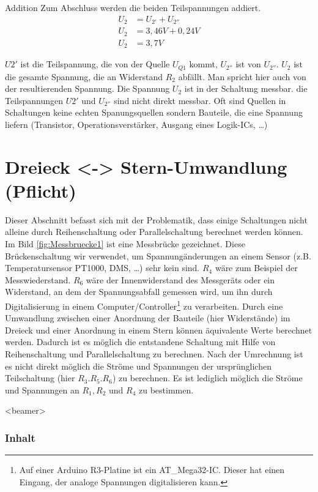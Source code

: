 \documentclass[a4paper, 10pt]{scrartcl}
\begin{document}
\begin{frame}{Addition}
  Zum Abschluss werden die beiden Teilspannungen addiert.
  \begin{align}
    U_2 &= U_{2'} + U_{2''}\\
    U_2 &= 3,46V + 0,24V\\
    U_2 &= 3,7V
  \end{align}
\end{frame}
$U{2'}$ ist die Teilspannung, die von der Quelle $U_{Q1}$ kommt, $U_{2''}$ ist von $U_{2''}$. $U_2$ ist die gesamte  Spannung, die an Widerstand $R_2$ abfällt. Man spricht hier auch von der resultierenden Spannung. Die Spannung $U_2$ ist in der Schaltung messbar. die Teilspannungen $U{2'}$ und $U_{2''}$ sind nicht direkt messbar. Oft sind Quellen in Schaltungen keine echten Spanungsquellen sondern Bauteile, die eine Spannung liefern (Transistor, Operationsverstärker, Ausgang eines Logik-ICs, \dots)

\section[Dreieck <-> Stern]{Dreieck <-> Stern-Umwandlung (Pflicht)}
Dieser Abschnitt befasst sich mit der Problematik, dass einige Schaltungen nicht alleine durch Reihenschaltung oder Parallelschaltung berechnet werden können. Im Bild \ref{fig:Messbruecke1} ist eine Messbrücke gezeichnet. Diese Brückenschaltung wir verwendet, um Spannungänderungen an einem Sensor (z.B. Temperatursensor PT1000, DMS, \dots ) sehr kein sind. $R_4$ wäre zum Beispiel der Messwiederstand. $R_6$ wäre der Innenwiderstand des Messgeräts oder ein Widerstand, an dem der Spannungsabfall gemessen wird, um ihn durch Digitalisierung in einem Computer/Controller\footnote{Auf einer Arduino R3-Platine ist ein AT\_Mega32-IC. Dieser hat einen Eingang, der analoge Spannungen digitalisieren kann.} zu verarbeiten. Durch eine Umwandlung zwischen einer Anordnung der Bauteile (hier Widerstände) im Dreieck und einer Anordnung in einem Stern können äquivalente Werte berechnet werden. Dadurch ist es möglich die entstandene Schaltung mit Hilfe von Reihenschaltung und Parallelschaltung zu berechnen. Nach der Umrechnung ist es nicht direkt möglich die Ströme und Spannungen der ursprünglichen Teilschaltung (hier $R_3. R_5. R_6$) zu berechnen. Es ist lediglich möglich die Ströme und Spannungen an $R_1, R_2$ und $R_4$ zu bestimmen.

\begin{frame}<beamer>
  \frametitle{Inhalt}
\end{frame}
\end{document}

